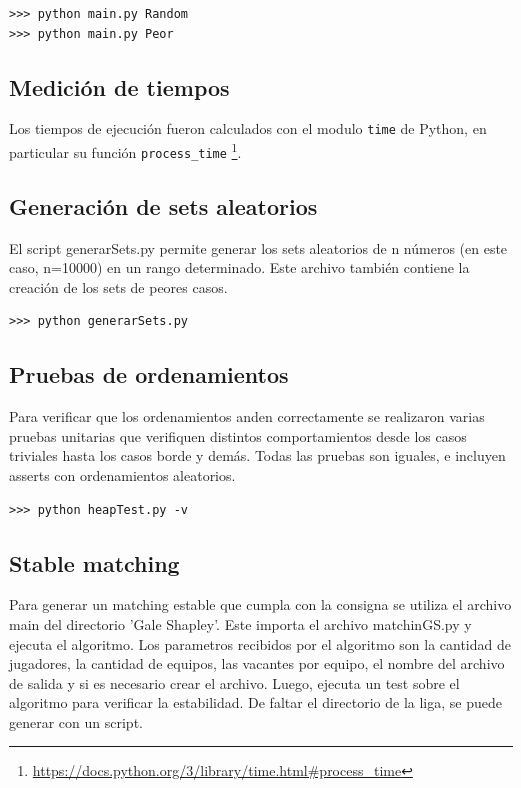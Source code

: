 \documentclass[article,a4paper]{article}
\begin{document}
\begin{verbatim}
>>> python main.py Random
>>> python main.py Peor
\end{verbatim}

\subsection{Medición de tiempos}
 Los tiempos de ejecución fueron calculados con el modulo \texttt{time} de Python, en particular su función \texttt{process\_time} \footnote{\url{https://docs.python.org/3/library/time.html\#process\_time}}.

\subsection{Generación de sets aleatorios}

El script generarSets.py permite generar los sets aleatorios de n números (en este caso, n=10000) en un rango determinado. Este archivo también contiene la creación de los sets de peores casos.

\begin{verbatim}
>>> python generarSets.py
\end{verbatim}

\subsection{Pruebas de ordenamientos}
Para verificar que los ordenamientos anden correctamente se realizaron varias pruebas unitarias que verifiquen distintos comportamientos desde los casos triviales hasta los casos borde y demás. Todas las pruebas son iguales, e incluyen asserts con ordenamientos aleatorios.

\begin{verbatim}
>>> python heapTest.py -v
\end{verbatim}

\subsection{Stable matching}
Para generar un matching estable que cumpla con la consigna se utiliza el archivo main del directorio 'Gale Shapley'. Este importa el archivo matchinGS.py y ejecuta el algoritmo. Los parametros recibidos por el algoritmo son la cantidad de jugadores, la cantidad de equipos, las vacantes por equipo, el nombre del archivo de salida y si es necesario crear el archivo. Luego, ejecuta un test sobre el algoritmo para verificar la estabilidad. De faltar el directorio de la liga, se puede generar con un script.
\end{document}
